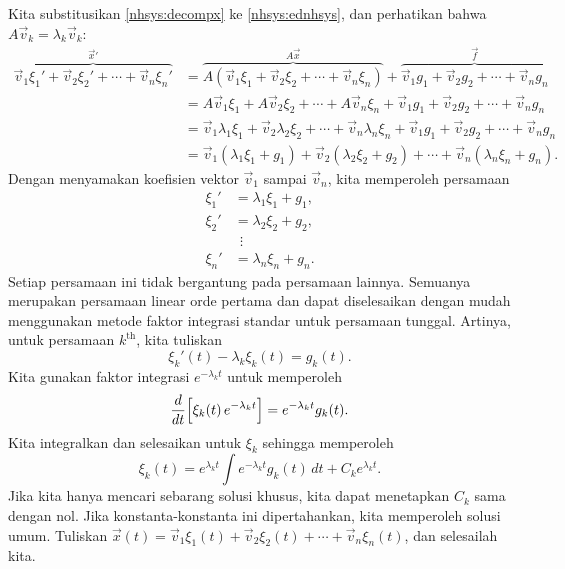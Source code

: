 Kita substitusikan \eqref{nhsys:decompx} ke \eqref{nhsys:ednhsys}, dan perhatikan bahwa
$A \vec{v}_k = \lambda_k \vec{v}_k$:
\begin{equation*}
\begin{split}
\overbrace{
\vec{v}_1 \xi_1' + 
\vec{v}_2 \xi_2' + \cdots +
\vec{v}_n \xi_n'
}^{{\vec{x}}'}
& =
\overbrace{
A \left( \vec{v}_1 \xi_1 + 
\vec{v}_2 \xi_2 + \cdots +
\vec{v}_n \xi_n \right)
}^{A\vec{x}}
+
\overbrace{
\vec{v}_1 g_1 + 
\vec{v}_2 g_2 + \cdots +
\vec{v}_n g_n
}^{\vec{f}}
\\
& = 
A \vec{v}_1 \xi_1 + 
A \vec{v}_2 \xi_2 + \cdots +
A \vec{v}_n \xi_n
+
\vec{v}_1 g_1 + 
\vec{v}_2 g_2 + \cdots +
\vec{v}_n g_n
\\
& =
\vec{v}_1 \lambda_1 \xi_1 + 
\vec{v}_2 \lambda_2 \xi_2 + \cdots +
\vec{v}_n \lambda_n \xi_n
+
\vec{v}_1 g_1 + 
\vec{v}_2 g_2 + \cdots +
\vec{v}_n g_n
\\
& =
\vec{v}_1 ( \lambda_1 \xi_1 + g_1 ) +
\vec{v}_2 ( \lambda_2 \xi_2 + g_2 ) + \cdots + 
\vec{v}_n ( \lambda_n \xi_n + g_n ) .
\end{split}
\end{equation*}
Dengan menyamakan koefisien vektor $\vec{v}_1$ sampai
$\vec{v}_n$, kita memperoleh
persamaan
\begin{align*}
\xi_1' & = \lambda_1 \xi_1 + g_1 , \\
\xi_2' & = \lambda_2 \xi_2 + g_2 , \\
& ~~ \vdots \\
\xi_n' & = \lambda_n \xi_n + g_n .
\end{align*}
Setiap persamaan ini tidak bergantung pada persamaan lainnya.  Semuanya merupakan
persamaan linear orde pertama dan dapat diselesaikan dengan mudah menggunakan
metode faktor integrasi standar untuk persamaan tunggal.
Artinya, untuk persamaan $k^{\text{th}}$,
kita tuliskan
\begin{equation*}
\xi_k'(t) - \lambda_k \xi_k(t) = g_k(t) .
\end{equation*}
Kita gunakan faktor integrasi $e^{-\lambda_k t}$ untuk memperoleh
\begin{equation*}
\frac{d}{dt}\Bigl[ \xi_k(t) \, e^{-\lambda_k t} \Bigr] = 
e^{-\lambda_k t} g_k(t) .
\end{equation*}
Kita integralkan dan selesaikan untuk $\xi_k$ sehingga memperoleh
\begin{equation*}
\xi_k(t) =  e^{\lambda_k t} 
\int e^{-\lambda_k t} g_k(t) \,dt + C_k e^{\lambda_k t} .
\end{equation*}
Jika kita hanya mencari sebarang solusi khusus, kita dapat menetapkan
$C_k$ sama dengan nol.  Jika konstanta-konstanta ini dipertahankan, kita memperoleh
solusi umum.  Tuliskan
$\vec{x}(t) =
\vec{v}_1 \xi_1(t) + 
\vec{v}_2 \xi_2(t) + \cdots +
\vec{v}_n \xi_n(t)$, dan selesailah kita.

